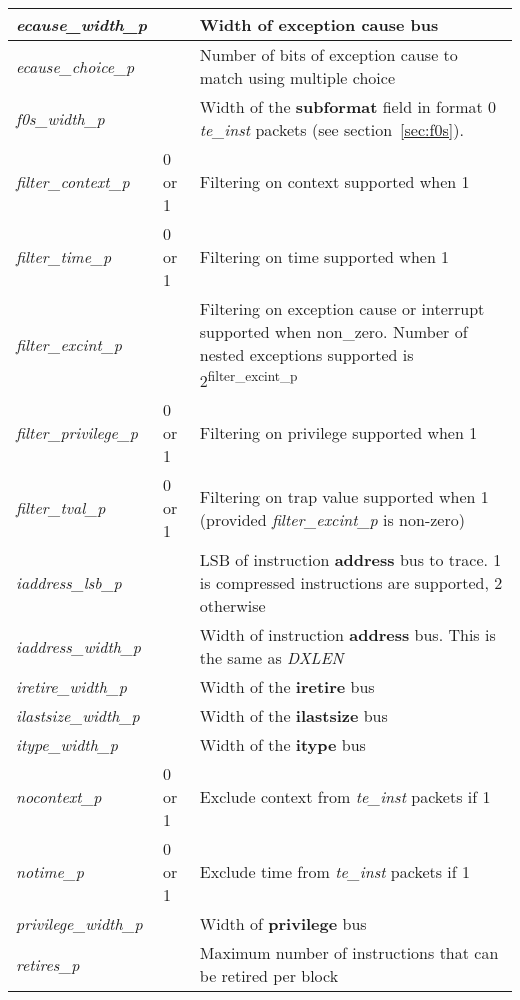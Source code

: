 \begin{table}[h]
\begin{tabulary}{\textwidth}{|l|l|p{100mm}|}
        \hline
        \textit{ecause\_width\_p} &  & Width of \textbf{exception cause} bus \\
        \hline
        \textit{ecause\_choice\_p} & & Number of bits of exception cause to match using multiple choice \\
        \hline
        \textit{f0s\_width\_p} & & Width of the \textbf{subformat} field in format 0 \textit{te\_inst} packets (see section~\ref{sec:f0s}). \\
        \hline
        \textit{filter\_context\_p} & 0 or 1 & Filtering on context supported when 1 \\
        \hline
        \textit{filter\_time\_p} & 0 or 1 & Filtering on time supported when 1 \\
        \hline
        \textit{filter\_excint\_p} & & Filtering on exception cause or interrupt supported when non\_zero.  Number of nested exceptions supported is 2\textsuperscript{filter\_excint\_p} \\
        \hline
        \textit{filter\_privilege\_p} & 0 or 1 & Filtering on privilege supported when 1 \\
        \hline
        \textit{filter\_tval\_p} & 0 or 1 & Filtering on trap value supported when 1 (provided \textit{filter\_excint\_p} is non-zero) \\
        \hline
        \textit{iaddress\_lsb\_p} & & LSB of instruction \textbf{address} bus to trace.  1 is compressed instructions are supported, 2 otherwise\\
        \hline
        \textit{iaddress\_width\_p} & & Width of instruction \textbf{address} bus. This is the same as \textit{DXLEN}\\
        \hline
        \textit{iretire\_width\_p} & & Width of the \textbf{iretire} bus\\
        \hline
        \textit{ilastsize\_width\_p} & & Width of the \textbf{ilastsize} bus\\
        \hline
        \textit{itype\_width\_p} & & Width of the \textbf{itype} bus\\
        \hline
        \textit{nocontext\_p} & 0 or 1 & Exclude context from \textit{te\_inst} packets if 1 \\
        \hline
        \textit{notime\_p} & 0 or 1 & Exclude time from \textit{te\_inst} packets if 1 \\
        \hline
        \textit{privilege\_width\_p} & & Width of \textbf{privilege} bus \\
        \hline
        \textit{retires\_p} &  & Maximum number of instructions that can be retired per block \\

\end{tabulary}
\end{table}
